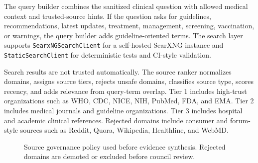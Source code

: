 The query builder combines the sanitized clinical question with allowed medical context and trusted-source hints. If the question asks for guidelines, recommendations, latest updates, treatment, management, screening, vaccination, or warnings, the query builder adds guideline-oriented terms. The search layer supports \texttt{SearxNGSearchClient} for a self-hosted SearXNG instance and \texttt{StaticSearchClient} for deterministic tests and CI-style validation.

Search results are not trusted automatically. The source ranker normalizes domains, assigns source tiers, rejects unsafe domains, classifies source type, scores recency, and adds relevance from query-term overlap. Tier 1 includes high-trust organizations such as WHO, CDC, NICE, NIH, PubMed, FDA, and EMA. Tier 2 includes medical journals and guideline organizations. Tier 3 includes hospital and academic clinical references. Rejected domains include consumer and forum-style sources such as Reddit, Quora, Wikipedia, Healthline, and WebMD.

\begin{figure}[htbp]
\centering
{}
\caption{Source governance policy used before evidence synthesis. Rejected domains are demoted or excluded before council review.}
\label{fig:source_governance}
\end{figure}


